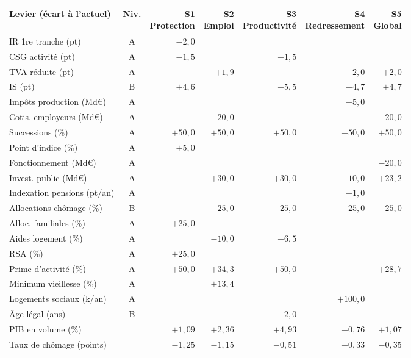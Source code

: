 \begin{tabular}{p{4.8cm}crrrrr}\toprule Levier (écart à l'actuel) & Niv. & \makecell{S1\\ Protection} & \makecell{S2\\ Emploi} & \makecell{S3\\ Productivité} & \makecell{S4\\ Redressement} & \makecell{S5\\ Global}\\ \midrule
IR 1re tranche (pt) & A & $-2{,}0$ &  &  &  & \\
CSG activité (pt) & A & $-1{,}5$ &  & $-1{,}5$ &  & \\
TVA réduite (pt) & A &  & $+1{,}9$ &  & $+2{,}0$ & $+2{,}0$\\
IS (pt) & B & $+4{,}6$ &  & $-5{,}5$ & $+4{,}7$ & $+4{,}7$\\
Impôts production (Md€) & A &  &  &  & $+5{,}0$ & \\
Cotis. employeurs (Md€) & A &  & $-20{,}0$ &  &  & $-20{,}0$\\
Successions (\%) & A & $+50{,}0$ & $+50{,}0$ & $+50{,}0$ & $+50{,}0$ & $+50{,}0$\\
Point d'indice (\%) & A & $+5{,}0$ &  &  &  & \\
Fonctionnement (Md€) & A &  &  &  &  & $-20{,}0$\\
Invest. public (Md€) & A &  & $+30{,}0$ & $+30{,}0$ & $-10{,}0$ & $+23{,}2$\\
Indexation pensions (pt/an) & A &  &  &  & $-1{,}0$ & \\
Allocations chômage (\%) & B &  & $-25{,}0$ & $-25{,}0$ & $-25{,}0$ & $-25{,}0$\\
Alloc. familiales (\%) & A & $+25{,}0$ &  &  &  & \\
Aides logement (\%) & A &  & $-10{,}0$ & $-6{,}5$ &  & \\
RSA (\%) & A & $+25{,}0$ &  &  &  & \\
Prime d'activité (\%) & A & $+50{,}0$ & $+34{,}3$ & $+50{,}0$ &  & $+28{,}7$\\
Minimum vieillesse (\%) & A &  & $+13{,}4$ &  &  & \\
Logements sociaux (k/an) & A &  &  &  & $+100{,}0$ & \\
Âge légal (ans) & B &  &  & $+2{,}0$ &  & \\
\midrule
PIB en volume (\%) & & $+1{,}09$ & $+2{,}36$ & $+4{,}93$ & $-0{,}76$ & $+1{,}07$\\
Taux de chômage (points) & & $-1{,}25$ & $-1{,}15$ & $-0{,}51$ & $+0{,}33$ & $-0{,}35$\\

\end{tabular}
